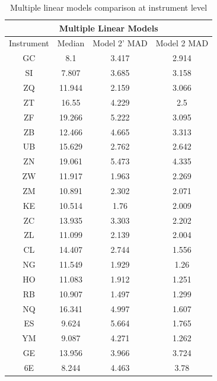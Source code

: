 \documentclass[12pt]{article}
\begin{document}
\begin{table}[H]
	\centering
	\caption{Multiple linear models comparison at instrument level}
	\label{Table 3}
	\begin{tabular}{|c|c|c|c|}
		\hline
		\multicolumn{4}{|c|}{Multiple Linear Models}     \\ \hline
		Instrument & Median & Model 2' MAD & Model 2 MAD \\ \hline
		GC         & 8.1    & 3.417        & 2.914       \\ \hline
		SI         & 7.807  & 3.685        & 3.158       \\ \hline
		ZQ         & 11.944 & 2.159        & 3.066       \\ \hline
		ZT         & 16.55  & 4.229        & 2.5         \\ \hline
		ZF         & 19.266 & 5.222        & 3.095       \\ \hline
		ZB         & 12.466 & 4.665        & 3.313       \\ \hline
		UB         & 15.629 & 2.762        & 2.642       \\ \hline
		ZN         & 19.061 & 5.473        & 4.335       \\ \hline
		ZW         & 11.917 & 1.963        & 2.269       \\ \hline
		ZM         & 10.891 & 2.302        & 2.071       \\ \hline
		KE         & 10.514 & 1.76         & 2.009       \\ \hline
		ZC         & 13.935 & 3.303        & 2.202       \\ \hline
		ZL         & 11.099 & 2.139        & 2.004       \\ \hline
		CL         & 14.407 & 2.744        & 1.556       \\ \hline
		NG         & 11.549 & 1.929        & 1.26        \\ \hline
		HO         & 11.083 & 1.912        & 1.251       \\ \hline
		RB         & 10.907 & 1.497        & 1.299       \\ \hline
		NQ         & 16.341 & 4.997        & 1.607       \\ \hline
		ES         & 9.624  & 5.664        & 1.765       \\ \hline
		YM         & 9.087  & 4.271        & 1.262       \\ \hline
		GE         & 13.956 & 3.966        & 3.724       \\ \hline
		6E         & 8.244  & 4.463        & 3.78        \\ \hline
	\end{tabular}
\end{table}
\end{document}
